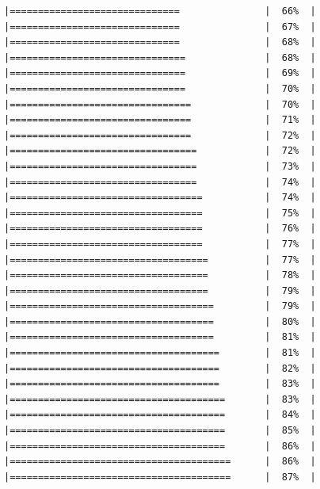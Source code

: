 \documentclass[
  krantz2]{krantz}
\begin{document}
\begin{verbatim}
|==============================               |  66%  |                                                     |==============================               |  67%  |                                                     |==============================               |  68%  |                                                     |===============================              |  68%  |                                                     |===============================              |  69%  |                                                     |===============================              |  70%  |                                                     |================================             |  70%  |                                                     |================================             |  71%  |                                                     |================================             |  72%  |                                                     |=================================            |  72%  |                                                     |=================================            |  73%  |                                                     |=================================            |  74%  |                                                     |==================================           |  74%  |                                                     |==================================           |  75%  |                                                     |==================================           |  76%  |                                                     |==================================           |  77%  |                                                     |===================================          |  77%  |                                                     |===================================          |  78%  |                                                     |===================================          |  79%  |                                                     |====================================         |  79%  |                                                     |====================================         |  80%  |                                                     |====================================         |  81%  |                                                     |=====================================        |  81%  |                                                     |=====================================        |  82%  |                                                     |=====================================        |  83%  |                                                     |======================================       |  83%  |                                                     |======================================       |  84%  |                                                     |======================================       |  85%  |                                                     |======================================       |  86%  |                                                     |=======================================      |  86%  |                                                     |=======================================      |  87%  |                        
\end{verbatim}
\end{document}
